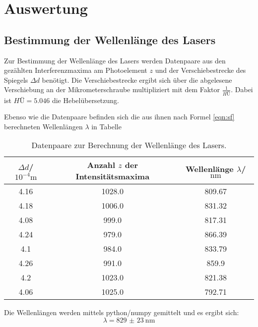 \section{Auswertung}
\label{sec:Auswertung}
\subsection{Bestimmung der Wellenlänge des Lasers}
Zur Bestimmung der Wellenlänge des Lasers werden Datenpaare aus den gezählten Interferenzmaxima am Photoelement $z$ und der Verschiebestrecke des Spiegels $\Delta d$ benötigt.
Die Verschiebestrecke ergibt sich über die abgelesene Verschiebung an der Mikrometerschraube multipliziert mit dem Faktor $\frac{1}{HÜ}$.
Dabei ist $HÜ=5.046$ die Hebelübersetzung.

Ebenso wie die Datenpaare befinden sich die aus ihnen nach Formel \eqref{eqn:sf} berechneten Wellenlängen $\lambda $ in Tabelle %
\begin{table}
  \caption{Datenpaare zur Berechnung der Wellenlänge des Lasers.}
  \label{tab:spieglein}
  \centering
\begin{tabular}{ccc}
  \toprule
$\Delta d$/$10^{-4}\si{\meter}$ & Anzahl $z$ der Intensitätsmaxima & Wellenlänge $\lambda$/$\si{\nano\meter}$ \\
\midrule
4.16 & 1028.0 & 809.67 \\
4.18 & 1006.0 & 831.32 \\
4.08 & 999.0 & 817.31 \\
4.24 & 979.0 & 866.39 \\
4.1 & 984.0 & 833.79 \\
4.26 & 991.0 & 859.9 \\
4.2 & 1023.0 & 821.38 \\
4.06 & 1025.0 & 792.71 \\
\bottomrule
\end{tabular}
\end{table}


Die Wellenlängen werden mittels python/numpy \cite{numpy} gemittelt und es ergibt sich:
\begin{equation}
\lambda=  \SI{829(23)}{\nano\meter}
\end{equation}
